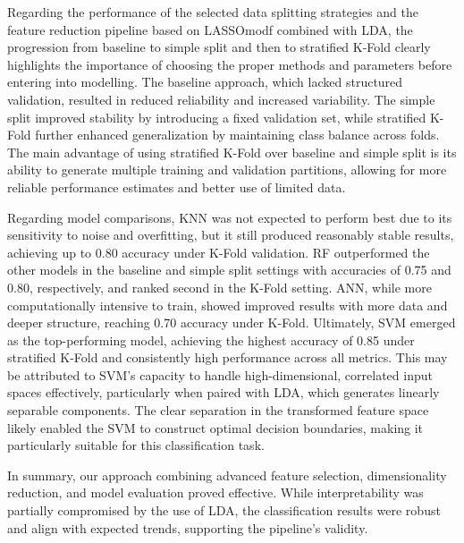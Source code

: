 Regarding the performance of the selected data splitting strategies and the
feature reduction pipeline based on LASSOmodf combined with LDA, the
progression from baseline to simple split and then to stratified K-Fold clearly
highlights the importance of choosing the proper methods and parameters before
entering into modelling. The baseline approach, which lacked structured
validation, resulted in reduced reliability and increased variability. The
simple split improved stability by introducing a fixed validation set, while
stratified K-Fold further enhanced generalization by maintaining class balance
across folds. The main advantage of using stratified K-Fold over baseline and
simple split is its ability to generate multiple training and validation
partitions, allowing for more reliable performance estimates and better use of
limited data.

Regarding model comparisons, KNN was not expected to perform best due to its
sensitivity to noise and overfitting, but it still produced reasonably stable
results, achieving up to 0.80 accuracy under K-Fold validation. RF outperformed
the other models in the baseline and simple split settings with accuracies of
0.75 and 0.80, respectively, and ranked second in the K-Fold setting. ANN,
while more computationally intensive to train, showed improved results with
more data and deeper structure, reaching 0.70 accuracy under K-Fold.
Ultimately, SVM emerged as the top-performing model, achieving the highest
accuracy of 0.85 under stratified K-Fold and consistently high performance
across all metrics. This may be attributed to SVM's capacity to handle
high-dimensional, correlated input spaces effectively, particularly when paired
with LDA, which generates linearly separable components. The clear separation
in the transformed feature space likely enabled the SVM to construct optimal
decision boundaries, making it particularly suitable for this classification
task.

In summary, our approach combining advanced feature selection, dimensionality
reduction, and model evaluation proved effective. While interpretability was
partially compromised by the use of LDA, the classification results were robust
and align with expected trends, supporting the pipeline’s validity.
